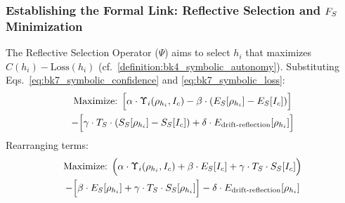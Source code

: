 \subsubsection{Establishing the Formal Link: Reflective Selection and \(F_S\) Minimization}
\label{subsubsec:bk7_establishing_the_formal_link_reflective_selection_and_}
The Reflective Selection Operator ($\Psi$) aims to select \(h_i\) that maximizes \(C(h_i) - \text{Loss}(h_i)\) (cf.~\ref{definition:bk4_symbolic_autonomy}).
Substituting Eqs.~\eqref{eq:bk7_symbolic_confidence} and \eqref{eq:bk7_symbolic_loss}:
\begin{multline*}
\text{Maximize: } \Big[ \alpha \cdot \Upsilon_i(\rho_{h_i}, I_c) - \beta \cdot (E_S[\rho_{h_i}] - E_S[I_c]) \Big] \\
- \Big[ \gamma \cdot T_S \cdot (S_S[\rho_{h_i}] - S_S[I_c]) + \delta \cdot E_{\text{drift-reflection}}[\rho_{h_i}] \Big]
\end{multline*}
Rearranging terms:
\begin{multline*}
\text{Maximize: } \Big( \alpha \cdot \Upsilon_i(\rho_{h_i}, I_c) + \beta \cdot E_S[I_c] + \gamma \cdot T_S \cdot S_S[I_c] \Big) \\
- \Big[ \beta \cdot E_S[\rho_{h_i}] + \gamma \cdot T_S \cdot S_S[\rho_{h_i}] \Big] - \delta \cdot E_{\text{drift-reflection}}[\rho_{h_i}]
\end{multline*}
